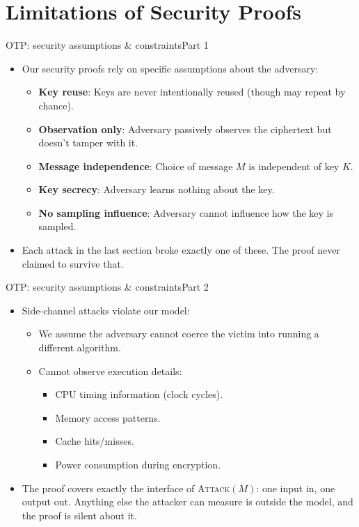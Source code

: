 \ifdefined\PRESENTATION\else\PassOptionsToClass{handout}{beamer}\fi\documentclass[aspectratio=169, lualatex]{beamer}
\begin{document}
\section{Limitations of Security Proofs}

\begin{frame}{OTP: security assumptions \& constraints}{Part 1}
	\begin{itemize}[<+->]
		\item Our security proofs rely on specific assumptions about the adversary:
		      \begin{itemize}[<+->]
			      \item \textbf{Key reuse}: Keys are never intentionally reused (though may repeat by chance).
			      \item \textbf{Observation only}: Adversary passively observes the ciphertext but doesn't tamper with it.
			      \item \textbf{Message independence}: Choice of message $M$ is independent of key $K$.
			      \item \textbf{Key secrecy}: Adversary learns nothing about the key.
			      \item \textbf{No sampling influence}: Adversary cannot influence how the key is sampled.
		      \end{itemize}
		\item Each attack in the last section broke exactly one of these. The proof never claimed to survive that.
	\end{itemize}
\end{frame}

\begin{frame}{OTP: security assumptions \& constraints}{Part 2}
	\begin{itemize}[<+->]
		\item Side-channel attacks violate our model:
		      \begin{itemize}[<+->]
			      \item We assume the adversary cannot coerce the victim into running a different algorithm.
			      \item Cannot observe execution details:
			            \begin{itemize}[<+->]
				            \item CPU timing information (clock cycles).
				            \item Memory access patterns.
				            \item Cache hits/misses.
				            \item Power consumption during encryption.
			            \end{itemize}
		      \end{itemize}
		\item The proof covers exactly the interface of \textsc{Attack}$(M)$: one input in, one output out. Anything else the attacker can measure is outside the model, and the proof is silent about it.
	\end{itemize}
\end{frame}
\end{document}
